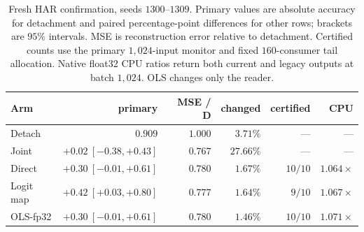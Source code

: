 \begin{table}[htbp]
\centering
\caption{Fresh HAR confirmation, seeds $1300$--$1309$. Primary values are absolute accuracy for detachment and paired percentage-point differences for other rows; brackets are $95\%$ intervals. MSE is reconstruction error relative to detachment. Certified counts use the primary $1{,}024$-input monitor and fixed $160$-consumer tail allocation. Native float32 CPU ratios return both current and legacy outputs at batch $1{,}024$. OLS changes only the reader.}
\label{tab:alignment_confirmation}
\footnotesize
\setlength{\tabcolsep}{4pt}
\begin{tabular}{lrrrrr}
\toprule
Arm & primary & MSE / D & changed & certified & CPU \\
\midrule
Detach & $0.909$ & $1.000$ & $3.71\%$ & --- & --- \\
Joint & $+0.02\ [-0.38,+0.43]$ & $0.767$ & $27.66\%$ & --- & --- \\
Direct & $+0.30\ [-0.01,+0.61]$ & $0.780$ & $1.67\%$ & $10/10$ & $1.064\times$ \\
Logit map & $+0.42\ [+0.03,+0.80]$ & $0.777$ & $1.64\%$ & $9/10$ & $1.067\times$ \\
OLS-fp32 & $+0.30\ [-0.01,+0.61]$ & $0.780$ & $1.46\%$ & $10/10$ & $1.071\times$ \\
\bottomrule
\end{tabular}
\end{table}
